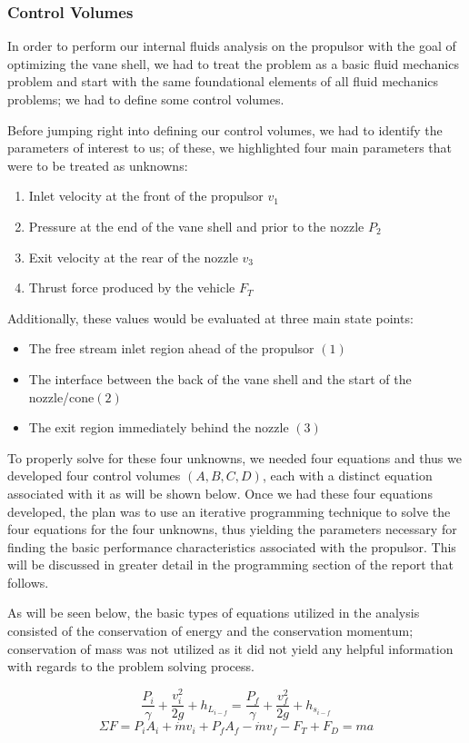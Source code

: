 \documentclass{report}
\begin{document}
\subsubsection{Control Volumes}
In order to perform our internal fluids analysis on the propulsor with the goal of optimizing the vane shell, we had to treat the problem as a basic fluid mechanics problem and start with the same foundational elements of all fluid mechanics problems; we had to define some control volumes.\par
Before jumping right into defining our control volumes, we had to identify the parameters of interest to us; of these, we highlighted four main parameters that were to be treated as unknowns:
\begin{enumerate}
\item Inlet velocity at the front of the propulsor $v_1$
\item Pressure at the end of the vane shell and prior to the nozzle $P_2$
\item Exit velocity at the rear of the nozzle $v_3$
\item Thrust force produced by the vehicle $F_T$
\end{enumerate}
Additionally, these values would be evaluated at three main state points:
\begin{itemize}
\item The free stream inlet region ahead of the propulsor $(1)$
\item The interface between the back of the vane shell and the start of the nozzle/cone$(2)$
\item The exit region immediately behind the nozzle $(3)$
\end{itemize}
To properly solve for these four unknowns, we needed four equations and thus we developed four control volumes $(A, B, C, D)$, each with a distinct equation associated with it as will be shown below.  Once we had these four equations developed, the plan was to use an iterative programming technique to solve the four equations for the four unknowns, thus yielding the parameters necessary for finding the basic performance characteristics associated with the propulsor.  This will be discussed in greater detail in the programming section of the report that follows.\par
As will be seen below, the basic types of equations utilized in the analysis consisted of the conservation of energy and the conservation momentum; conservation of mass was not utilized as it did not yield any helpful information with regards to the problem solving process.\par
\begin{equation}
\frac{P_i}{\gamma}+\frac{v_i^2}{2g}+h_{L_{i-f}}=\frac{P_f}{\gamma}+\frac{v_f^2}{2g}+h_{s_{i-f}}
\end{equation}
\begin{equation}
\Sigma F=P_iA_i+\dot{m}v_i+P_fA_f-\dot{m}v_f-F_T+F_D=ma
\end{equation}
\end{document}
